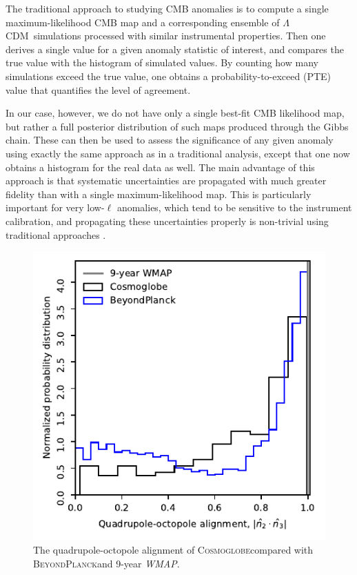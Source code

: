 \documentclass[twocolumn]{../../common/aa}
\def\WMAP{\emph{WMAP}}
\def\LCDM{$\Lambda$CDM}
\newcommand{\BP}{\textsc{BeyondPlanck}}
\newcommand{\Cosmoglobe}{\textsc{Cosmoglobe}}
\begin{document}
The traditional approach to studying CMB anomalies is to compute a single maximum-likelihood CMB map and a corresponding ensemble of \LCDM\ simulations processed with similar instrumental properties. Then one derives a single value for a given anomaly statistic of interest, and compares the true value with the histogram of simulated values. By counting how many simulations exceed the true value, one obtains a probability-to-exceed (PTE) value that quantifies the level of agreement. 

In our case, however, we do not have only a single best-fit CMB likelihood map, but rather a full posterior distribution of such maps produced through the Gibbs chain. These can then be used to assess the significance of any given anomaly using exactly the same approach as in a traditional analysis, except that one now obtains a histogram for the real data as well. The main advantage of this approach is that systematic uncertainties are propagated with much greater fidelity than with a single maximum-likelihood map. This is particularly important for very low-$\ell$ anomalies, which tend to be sensitive to the instrument calibration, and propagating these uncertainties properly is non-trivial using traditional approaches \citep{bp04}. %

\begin{figure}[t]
	\includegraphics[width=\columnwidth]{figures/WMAP_n_2_n_3.pdf}
	\caption{The quadrupole-octopole alignment of \Cosmoglobe compared with \BP and 9-year \WMAP.}
        \label{fig:alignment}
\end{figure}
\end{document}
